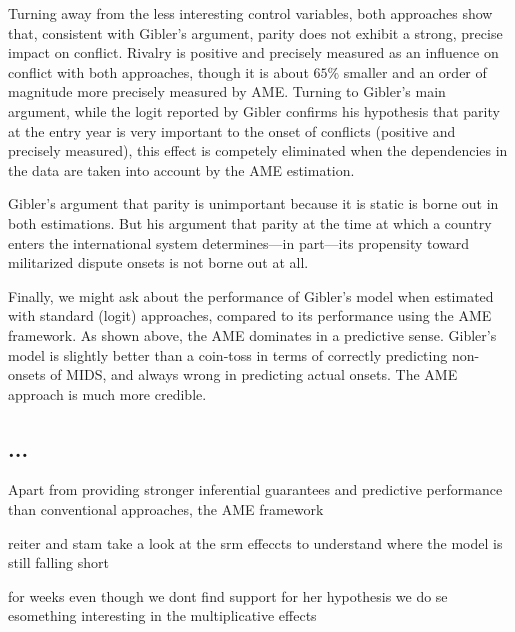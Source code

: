 Turning away from the less interesting control variables, both approaches show that, consistent with Gibler's argument, parity does not exhibit a strong, precise impact on conflict. Rivalry is positive and precisely measured as an influence on conflict with both approaches, though it is about $65\%$ smaller and an order of magnitude more precisely measured by AME. Turning to Gibler's main argument, while the logit reported by Gibler confirms his hypothesis that parity at the entry year is very important to the onset of conflicts (positive and precisely measured), this effect is competely eliminated when the dependencies in the data are taken into account by the AME estimation. 

Gibler's argument that parity is unimportant because it is static is borne out in both estimations. But his argument that parity at the time at which a country enters the international system determines---in part---its propensity toward militarized dispute onsets is not borne out at all. 

Finally, we might ask about the performance of Gibler's model when estimated with standard (logit) approaches, compared to its performance using the AME framework. As shown above, the AME dominates in a predictive sense. Gibler's model is slightly better than a coin-toss in terms of correctly predicting non-onsets of MIDS, and always wrong in predicting actual onsets.  The AME approach is much more credible.

\subsection{...}

Apart from providing stronger inferential guarantees and predictive performance than conventional approaches, the AME framework 


reiter and stam take a look at the srm effeccts to understand where the model is still falling short


for weeks even though we dont find support for her hypothesis we do se esomething interesting in the multiplicative effects



